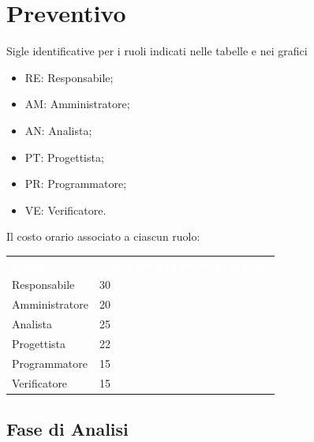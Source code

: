 \section{Preventivo}
Sigle identificative per i ruoli indicati nelle tabelle e nei grafici
\begin{itemize}
    \item RE: Responsabile;
    \item AM: Amministratore;
    \item AN: Analista;
    \item PT: Progettista;
    \item PR: Programmatore;
    \item VE: Verificatore.
\end{itemize}
Il costo orario associato a ciascun ruolo:
{
	\renewcommand{\arraystretch}{2}
	\centering

	\begin{longtable}{ C{2cm} C{3cm}}
		\textcolor{white}{\textbf{Ruolo}} & \textcolor{white}{\textbf{Costo per ora espresso in euro}}\\	
        
        Responsabile & 30\\
        Amministratore & 20\\
        Analista & 25\\
        Progettista & 22\\
        Programmatore & 15\\
        Verificatore & 15\\
		
	\end{longtable}
}

\subsection{Fase di Analisi}

